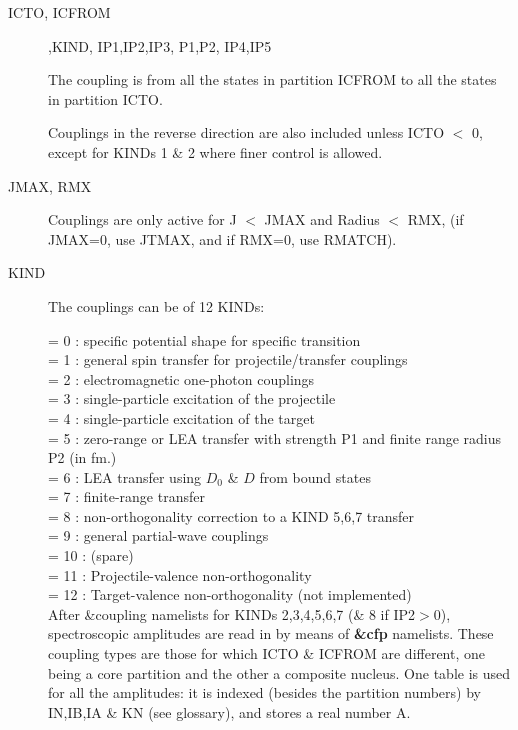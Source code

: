 \documentclass[11pt]{article}
\begin{document}
\begin{description}
\item[ICTO, ICFROM] ,KIND,  IP1,IP2,IP3,  P1,P2,  IP4,IP5

The coupling is from all the states in partition ICFROM
to all the states in partition ICTO.

Couplings in the reverse direction are also included unless
ICTO $<$ 0, except for KINDs 1 \& 2 where finer control is allowed.

\item[JMAX, RMX]
Couplings are only active for J $<$ JMAX and Radius $<$ RMX,
(if JMAX=0, use JTMAX, and if RMX=0, use  RMATCH).

\newpage
\item[KIND]
The couplings can be of 12 KINDs:

            = 0 : specific potential shape for specific transition\\
            = 1 : general spin transfer for projectile/transfer couplings\\
            = 2 : electromagnetic one-photon couplings\\
            = 3 : single-particle excitation of the projectile\\
            = 4 : single-particle excitation of the target\\
            = 5 : zero-range or LEA transfer with strength P1 and finite range radius P2 (in fm.)\\
            = 6 : LEA transfer using $D_0$ \& $D$ from bound states\\
            = 7 : finite-range transfer\\
            = 8 : non-orthogonality correction to a KIND 5,6,7 transfer\\
            = 9 : general partial-wave couplings\\
            = 10 : (spare)\\
            = 11 : Projectile-valence non-orthogonality\\
            = 12 : Target-valence non-orthogonality (not implemented)\\

After \&coupling namelists for KINDs 2,3,4,5,6,7 (\& 8 if IP2$>$0),
spectroscopic amplitudes are read in by means of {\bf \&cfp} namelists.
These coupling types are those for which ICTO \& ICFROM are
different, one being a core partition and the other a composite
nucleus. One table is used for all the amplitudes: it is indexed
(besides the partition numbers) by IN,IB,IA \& KN (see glossary),
and stores a real number A.


\end{description}
\end{document}
